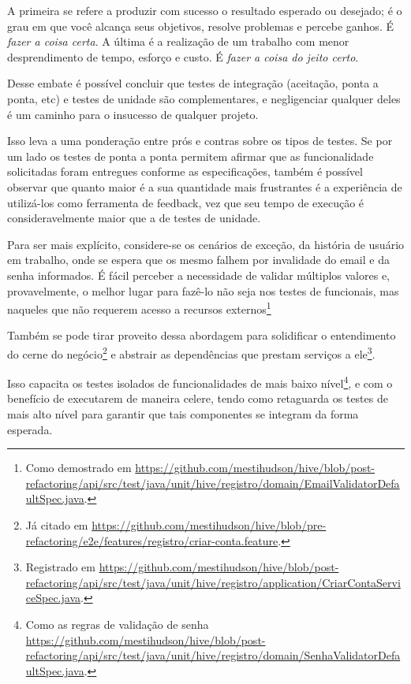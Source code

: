   A primeira se refere a produzir com sucesso o resultado esperado ou desejado; é o grau em que você alcança seus objetivos, resolve problemas e percebe ganhos. É \emph{fazer a coisa certa}.
      A última é a realização de um trabalho com menor desprendimento de tempo, esforço e custo. É \emph{fazer a coisa do jeito certo}.\cite[p.2, tradução nossa]{Stack2016}

  Desse embate é possível concluir que testes de integração (aceitação, ponta a ponta, etc) e testes de unidade são complementares, e negligenciar qualquer deles é um caminho para o insucesso de qualquer projeto.

  Isso leva a uma ponderação entre prós e contras sobre os tipos de testes. Se por um lado os testes de ponta a ponta permitem afirmar que as funcionalidade solicitadas foram entregues conforme as especificações, também é possível observar que quanto maior é a sua quantidade mais frustrantes é a experiência de utilizá-los como ferramenta de feedback, vez que seu tempo de execução é consideravelmente maior que a de testes de unidade.

  Para ser mais explícito, considere-se os cenários de exceção, da história de usuário em trabalho, onde se espera que os mesmo falhem por invalidade do email e da senha informados. É fácil perceber a necessidade de validar múltiplos valores e, provavelmente, o melhor lugar para fazê-lo não seja nos testes de funcionais, mas naqueles que não requerem acesso a recursos externos\footnote{Como demostrado em \url{https://github.com/mestihudson/hive/blob/post-refactoring/api/src/test/java/unit/hive/registro/domain/EmailValidatorDefaultSpec.java}.}

  Também se pode tirar proveito dessa abordagem para solidificar o entendimento do cerne do negócio\footnote{Já citado em \url{https://github.com/mestihudson/hive/blob/pre-refactoring/e2e/features/registro/criar-conta.feature}.} e abstrair as dependências que prestam serviços a ele\footnote{Registrado em \url{https://github.com/mestihudson/hive/blob/post-refactoring/api/src/test/java/unit/hive/registro/application/CriarContaServiceSpec.java}.}.

  Isso capacita os testes isolados de funcionalidades de mais baixo nível\footnote{Como as regras de validação de senha \url{https://github.com/mestihudson/hive/blob/post-refactoring/api/src/test/java/unit/hive/registro/domain/SenhaValidatorDefaultSpec.java}.}, e com o benefício de executarem de maneira celere, tendo como retaguarda os testes de mais alto nível para garantir que tais componentes se integram da forma esperada.

